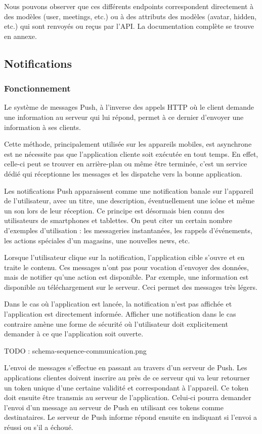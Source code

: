 \documentclass[french]{article}
\begin{document}
	Nous pouvons observer que ces différents endpoints correspondent directement à des modèles (user, meetings, etc.) ou à des attributs des modèles (avatar, hidden, etc.) qui sont renvoyés ou reçus par l'API. La documentation complète se trouve en annexe. 
	
	\subsection{Notifications}
	\subsubsection{Fonctionnement}
	
	Le système de messages Push, à l'inverse des appels HTTP où le client demande une information au serveur qui lui répond, permet à ce dernier d'envoyer une information à ses clients.
	
	Cette méthode, principalement utilisée sur les appareils mobiles, est asynchrone est ne nécessite pas que l'application cliente soit exécutée en tout temps. En effet, celle-ci peut se trouver en arrière-plan ou même être terminée, c'est un service dédié qui réceptionne les messages et les dispatche vers la bonne application.
	
	Les notifications Push apparaissent comme une notification banale sur l'appareil de l'utilisateur, avec un titre, une description, éventuellement une icône et même un son lors de leur réception. Ce principe est désormais bien connu des utilisateurs de smartphones et tablettes. On peut citer un certain nombre d'exemples d'utilisation : les messageries instantanées, les rappels d'événements, les actions spéciales d'un magasins, une nouvelles news, etc.
	
	Lorsque l'utilisateur clique sur la notification, l'application cible s'ouvre et en traite le contenu. Ces messages n'ont pas pour vocation d'envoyer des données, mais de notifier qu'une action est disponible. Par exemple, une information est disponible au téléchargement sur le serveur. Ceci permet des messages très légers.
	
	Dans le cas où l'application est lancée, la notification n'est pas affichée et l'application est directement informée. Afficher une notification dans le cas contraire amène une forme de sécurité où l'utilisateur doit explicitement demander à ce que l'application soit ouverte.
	
	TODO : schema-sequence-communication.png

	L'envoi de messages s'effectue en passant au travers d'un serveur de Push. Les applications clientes doivent inscrire au près de ce serveur qui va leur retourner un token unique d'une certaine validité et correspondant à l'appareil. Ce token doit ensuite être transmis au serveur de l'application. Celui-ci pourra demander l'envoi d'un message au serveur de Push en utilisant ces tokens comme destinataires. Le serveur de Push informe répond ensuite en indiquant si l'envoi a réussi ou s'il a échoué. 
	
\end{document}
